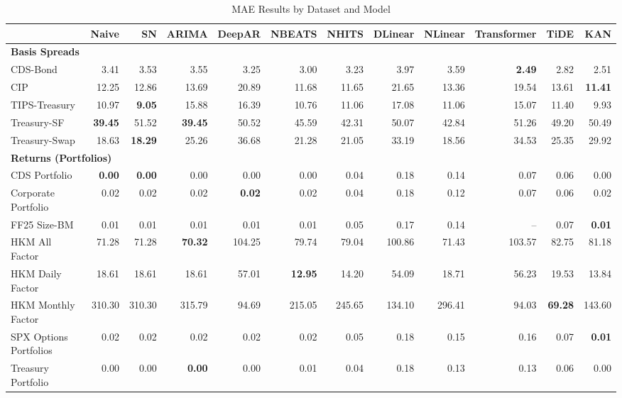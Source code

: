 
\begin{table}[htbp]
\centering
\caption{MAE Results by Dataset and Model}
\label{tab:mae_results}
\scriptsize
\setlength{\tabcolsep}{1.5pt}
\renewcommand{\arraystretch}{0.9}
\begin{tabular}{@{}lrrrrrrrrrrr@{}}
\toprule
 & Naive & SN & ARIMA & DeepAR & NBEATS & NHITS & DLinear & NLinear & Transformer & TiDE & KAN \\
\midrule
\multicolumn{12}{l}{\textbf{Basis Spreads}} \\
CDS-Bond & 3.41 & 3.53 & 3.55 & 3.25 & 3.00 & 3.23 & 3.97 & 3.59 & \textbf{2.49} & 2.82 & 2.51 \\
CIP & 12.25 & 12.86 & 13.69 & 20.89 & 11.68 & 11.65 & 21.65 & 13.36 & 19.54 & 13.61 & \textbf{11.41} \\
TIPS-Treasury & 10.97 & \textbf{9.05} & 15.88 & 16.39 & 10.76 & 11.06 & 17.08 & 11.06 & 15.07 & 11.40 & 9.93 \\
Treasury-SF & \textbf{39.45} & 51.52 & \textbf{39.45} & 50.52 & 45.59 & 42.31 & 50.07 & 42.84 & 51.26 & 49.20 & 50.49 \\
Treasury-Swap & 18.63 & \textbf{18.29} & 25.26 & 36.68 & 21.28 & 21.05 & 33.19 & 18.56 & 34.53 & 25.35 & 29.92 \\
\midrule
\multicolumn{12}{l}{\textbf{Returns (Portfolios)}} \\
CDS Portfolio & \textbf{0.00} & \textbf{0.00} & 0.00 & 0.00 & 0.00 & 0.04 & 0.18 & 0.14 & 0.07 & 0.06 & 0.00 \\
Corporate Portfolio & 0.02 & 0.02 & 0.02 & \textbf{0.02} & 0.02 & 0.04 & 0.18 & 0.12 & 0.07 & 0.06 & 0.02 \\
FF25 Size-BM & 0.01 & 0.01 & 0.01 & 0.01 & 0.01 & 0.05 & 0.17 & 0.14 & -- & 0.07 & \textbf{0.01} \\
HKM All Factor & 71.28 & 71.28 & \textbf{70.32} & 104.25 & 79.74 & 79.04 & 100.86 & 71.43 & 103.57 & 82.75 & 81.18 \\
HKM Daily Factor & 18.61 & 18.61 & 18.61 & 57.01 & \textbf{12.95} & 14.20 & 54.09 & 18.71 & 56.23 & 19.53 & 13.84 \\
HKM Monthly Factor & 310.30 & 310.30 & 315.79 & 94.69 & 215.05 & 245.65 & 134.10 & 296.41 & 94.03 & \textbf{69.28} & 143.60 \\
SPX Options Portfolios & 0.02 & 0.02 & 0.02 & 0.02 & 0.02 & 0.05 & 0.18 & 0.15 & 0.16 & 0.07 & \textbf{0.01} \\
Treasury Portfolio & 0.00 & 0.00 & \textbf{0.00} & 0.00 & 0.01 & 0.04 & 0.18 & 0.13 & 0.13 & 0.06 & 0.00 \\

\end{tabular}
\end{table}
